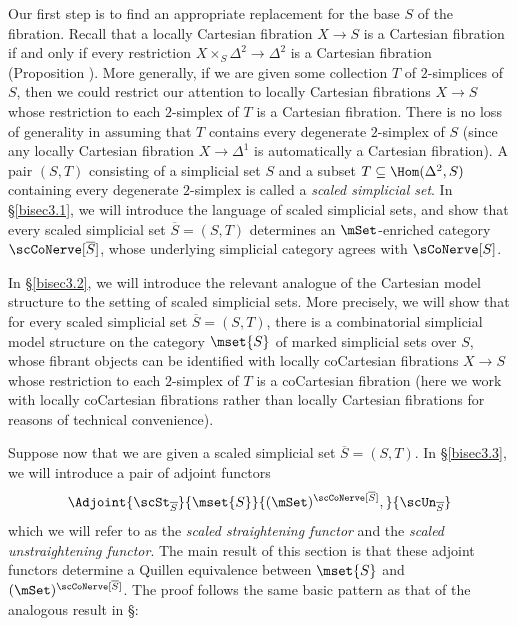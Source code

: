 Our first step is to find an appropriate replacement for the base $S$ of the fibration. 
Recall that a locally Cartesian fibration $X \rightarrow S$ is a Cartesian fibration if and
only if every restriction $X \times_{S} \Delta^2 \rightarrow \Delta^2$ is a Cartesian fibration
(Proposition ). More generally, if we are given some collection $T$ of
$2$-simplices of $S$, then we could restrict our attention to locally Cartesian fibrations
$X \rightarrow S$ whose restriction to each $2$-simplex of $T$ is a Cartesian fibration.
There is no loss of generality in assuming that $T$ contains every degenerate $2$-simplex
of $S$ (since any locally Cartesian fibration $X \rightarrow \Delta^1$ is automatically
a Cartesian fibration). A pair $(S,T)$ consisting of a simplicial set $S$ and
a subset $T \subseteq \Hom( \Delta^2,S)$ containing every degenerate $2$-simplex is called a {\it scaled simplicial set}. In \S \ref{bisec3.1}, we will introduce the language of scaled simplicial sets,
and show that every scaled simplicial set $\overline{S} = (S,T)$ determines an
$\mSet$-enriched category $\scCoNerve[ \overline{S} ]$, whose underlying simplicial category
agrees with $\sCoNerve[S]$.

In \S \ref{bisec3.2}, we will introduce the relevant analogue of the Cartesian model structure
to the setting of scaled simplicial sets. More precisely, we will show that for every
scaled simplicial set $\overline{S} = (S,T)$, there is a combinatorial simplicial model structure
on the category $\mset{S}$ of marked simplicial sets over $S$, whose fibrant objects can
be identified with locally coCartesian fibrations $X \rightarrow S$ whose restriction to each
$2$-simplex of $T$ is a coCartesian fibration (here we work with locally coCartesian fibrations
rather than locally Cartesian fibrations for reasons of technical convenience).

Suppose now that we are given a scaled simplicial set $\overline{S} = (S,T)$.
In \S \ref{bisec3.3}, we will introduce a pair of adjoint functors
$$ \Adjoint{\scSt_{ \overline{S} }}{ \mset{S}}{ (\mSet)^{\scCoNerve[\overline{S}]},}{ \scUn_{ \overline{S} }}$$
which we will refer to as the {\it scaled straightening functor} and the {\it scaled unstraightening functor}.
The main result of this section is that these adjoint functors determine a Quillen equivalence
between $\mset{S}$ and $(\mSet)^{\scCoNerve[ \overline{S}]}$. The proof follows the same
basic pattern as that of the analogous result in \S {}:


